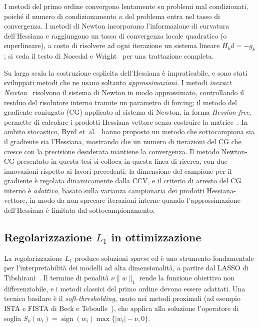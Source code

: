 \documentclass[a4paper,12pt]{article}
\numberwithin{equation}{section}
\numberwithin{figure}{section}
\numberwithin{table}{section}
\begin{document}
I metodi del primo ordine convergono lentamente su problemi mal condizionati,
poiché il numero di condizionamento $\kappa$ del problema entra nel tasso di
convergenza. I metodi di Newton incorporano l'informazione di curvatura
dell'Hessiana e raggiungono un tasso di convergenza locale quadratico (o
superlineare), a costo di risolvere ad ogni iterazione un sistema lineare
$H_k d = -g_k$; si veda il testo di Nocedal e Wright~\cite{nocedal2006} per
una trattazione completa.

Su larga scala la costruzione esplicita dell'Hessiana è impraticabile, e sono
stati sviluppati metodi che ne usano soltanto \emph{approssimazioni}. I metodi
\emph{inexact Newton}~\cite{dembo1982} risolvono il sistema di Newton in modo
approssimato, controllando il residuo del risolutore interno tramite un
parametro di forcing; il metodo del gradiente coniugato (CG) applicato al
sistema di Newton, in forma \emph{Hessian-free}, permette di calcolare i
prodotti Hessiana-vettore senza costruire la matrice~\cite{shewchuk1994,
nocedal2006}. In ambito stocastico, Byrd et~al.~\cite{byrd2011} hanno proposto
un metodo che sottocampiona sia il gradiente sia l'Hessiana, mostrando che un
numero di iterazioni del CG che cresce con la precisione desiderata mantiene la
convergenza. Il metodo Newton-CG presentato in questa tesi si colloca in questa
linea di ricerca, con due innovazioni rispetto ai lavori precedenti: la
dimensione del campione per il gradiente è regolata dinamicamente dalla CCV, e
il criterio di arresto del CG interno è \emph{adattivo}, basato sulla varianza
campionaria dei prodotti Hessiana-vettore, in modo da non sprecare iterazioni
interne quando l'approssimazione dell'Hessiana è limitata dal sottocampionamento.

\subsection{Regolarizzazione $L_1$ in ottimizzazione}

La regolarizzazione $L_1$ produce soluzioni \emph{sparse} ed è uno strumento
fondamentale per l'interpretabilità dei modelli ad alta dimensionalità, a
partire dal LASSO di Tibshirani~\cite{tibshirani1996}. Il termine di penalità
$\nu\|w\|_1$ rende la funzione obiettivo non differenziabile, e i metodi classici
del primo ordine devono essere adattati. Una tecnica basilare è il
\emph{soft-thresholding}, usato nei metodi proximali (ad esempio ISTA e FISTA
di Beck e Teboulle~\cite{beck2009}), che applica alla soluzione l'operatore di
soglia $S_\nu(w_i) = \operatorname{sign}(w_i)\max\{|w_i| - \nu, 0\}$.
\end{document}
